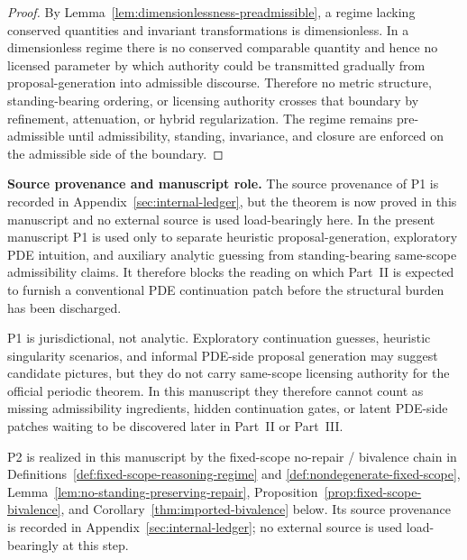 \begin{proof}
By Lemma~\ref{lem:dimensionlessness-preadmissible}, a regime lacking conserved quantities and invariant transformations is dimensionless. In a dimensionless regime there is no conserved comparable quantity and hence no licensed parameter by which authority could be transmitted gradually from proposal-generation into admissible discourse. Therefore no metric structure, standing-bearing ordering, or licensing authority crosses that boundary by refinement, attenuation, or hybrid regularization. The regime remains pre-admissible until admissibility, standing, invariance, and closure are enforced on the admissible side of the boundary.
\end{proof}

\noindent\textbf{Source provenance and manuscript role.} The source provenance of P1 is recorded in Appendix~\ref{sec:internal-ledger}, but the theorem is now proved in this manuscript and no external source is used load-bearingly here. In the present manuscript P1 is used only to separate heuristic proposal-generation, exploratory PDE intuition, and auxiliary analytic guessing from standing-bearing same-scope admissibility claims. It therefore blocks the reading on which Part~II is expected to furnish a conventional PDE continuation patch before the structural burden has been discharged.

\begin{remark}\label{rem:ametric-application-pde-misread}
P1 is jurisdictional, not analytic. Exploratory continuation guesses, heuristic singularity scenarios, and informal PDE-side proposal generation may suggest candidate pictures, but they do not carry same-scope licensing authority for the official periodic theorem. In this manuscript they therefore cannot count as missing admissibility ingredients, hidden continuation gates, or latent PDE-side patches waiting to be discovered later in Part~II or Part~III.
\end{remark}

\begin{remark}\label{rem:p2-proof-location}
P2 is realized in this manuscript by the fixed-scope no-repair / bivalence chain in Definitions~\ref{def:fixed-scope-reasoning-regime} and \ref{def:nondegenerate-fixed-scope}, Lemma~\ref{lem:no-standing-preserving-repair}, Proposition~\ref{prop:fixed-scope-bivalence}, and Corollary~\ref{thm:imported-bivalence} below. Its source provenance is recorded in Appendix~\ref{sec:internal-ledger}; no external source is used load-bearingly at this step.
\end{remark}

